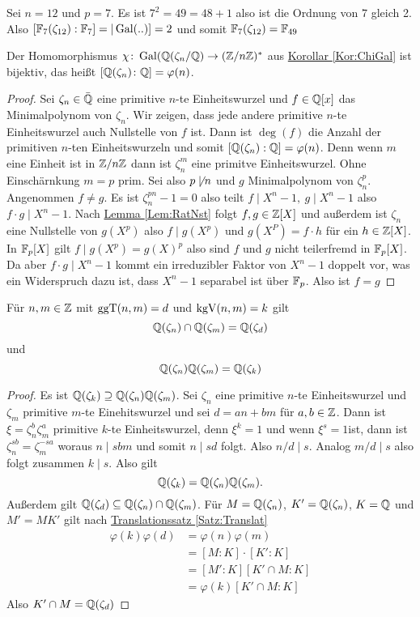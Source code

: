 \begin{Bsp}
  Sei $n=12$ und $p=7$. Es ist $7^2=49 =48+1$ also ist die Ordnung von $7$ gleich 2.
    Also $[\mathbb{F}_7(\zeta_{12}):\mathbb{F}_7]=|\operatorname{Gal}(..)]=2$ und somit $\mathbb{F}_7(\zeta_{12})=\mathbb{F}_{49}$
\end{Bsp}
\begin{Satz}
    Der Homomorphismus $\chi\colon\operatorname{Gal}(\mathbb{Q}(\zeta_n/\mathbb{Q})\to(\mathbb{Z}/n\mathbb{Z})^*$ aus \hyperref[Kor:ChiGal]{Korollar \ref{Kor:ChiGal}} ist bijektiv, das heißt $[\mathbb{Q}(\zeta_n)\colon \mathbb{Q}]=\varphi(n)$.
\end{Satz}
\begin{proof}
    Sei $\zeta_n\in\bar{\mathbb{Q}}$ eine primitive $n$-te Einheitswurzel und $f\in\mathbb{Q}[x]$ das Minimalpolynom von $\zeta_n$.
    Wir zeigen, dass jede andere primitive $n$-te Einheitswurzel auch Nullstelle von $f$ ist. Dann ist $
    \deg(f)$ die Anzahl der primitiven $n$-ten Einheitswurzeln und somit $[\mathbb{Q}(\zeta_n):\mathbb{Q}]=\varphi(n)$.
    Denn wenn $m$ eine Einheit ist in $\mathbb{Z}/n\mathbb{Z}$ dann ist $\zeta_n^m$ eine primitve Einheitswurzel.
    Ohne Einschärnkung $m=p$ prim.
    Sei also $p\not\mid n$ und $g$ Minimalpolynom von $\zeta_n^p$. Angenommen $f\neq g$.
    Es ist $\zeta_n^{pn}-1=0$ also teilt $f\mid X^n-1,\ g\mid X^n-1$ also $f\cdot g\mid X^n-1$. Nach \hyperref[Lem:RatNst]{Lemma \ref{Lem:RatNst}} folgt $f,g\in\mathbb{Z}[X]$ und außerdem ist $\zeta_n$ eine Nullstelle von $g(X^p)$ also $f\mid g(X^p)$ und $g(X^P)=f\cdot h$ für ein $h\in \mathbb{Z}[X]$.
    In $\mathbb{F}_p[X]$ gilt $f\mid g(X^p)=g(X)^p$ also sind $f$ und $g$ nicht teilerfremd in $\mathbb{F}_p[X]$. Da aber $f\cdot g\mid X^n-1$ kommt ein irreduzibler Faktor von $X^n-1$ doppelt vor, was ein Widerspruch dazu ist, dass $X^n-1$ separabel ist über $\mathbb{F}_p$.
    Also ist $f=g$
\end{proof}
\begin{Kor}
    Für $n,m\in\mathbb{Z}$ mit $\operatorname{ggT}(n,m)=d$ und $\operatorname{kgV}(n,m)=k$ gilt $$\mathbb{Q}(\zeta_n)\cap \mathbb{Q}(\zeta_m)=\mathbb{Q}(\zeta_d)$$ und $$\mathbb{Q}(\zeta_n)\mathbb{Q}(\zeta_m)=\mathbb{Q}(\zeta_k)$$
\end{Kor}
\begin{proof}
     Es ist $\mathbb{Q}(\zeta_k)\supseteq\mathbb{Q}(\zeta_n)\mathbb{Q}(\zeta_m)$.
     Sei $\zeta_n$ eine primitive $n$-te Einheitswurzel und $\zeta_m$ primitive $m$-te Einehitswurzel und sei $d=an+bm$ für $a,b\in\mathbb{Z}$.
     Dann ist $\xi=\zeta_n^b\zeta_m^a$ primitive $k$-te Einheitswurzel, denn $\xi^k=1$ und wenn $\xi^s=1$ist, dann ist $\zeta_n^{sb}=\zeta_m^{-sa}$ woraus $n\mid sbm$ und somit $n\mid sd$ folgt. Also $n/d\mid s$. Analog $m/d\mid s$ also folgt zusammen $k\mid s$. Also gilt $$\mathbb{Q}(\zeta_k)=\mathbb{Q}(\zeta_n)\mathbb{Q}(\zeta_m).$$ Außerdem gilt
     $\mathbb{Q}(\zeta_d)\subseteq \mathbb{Q}(\zeta_n)\cap\mathbb{Q}(\zeta_m)$.
     Für $M=\mathbb{Q}(\zeta_n)$, $K'=\mathbb{Q}(\zeta_n)$, $K=\mathbb{Q}$ und $M'=MK'$ gilt nach \hyperref[Satz:Translat]{Translationssatz \ref{Satz:Translat}} 
     \begin{align*}
         \varphi(k)\varphi(d)&=\varphi(n)\varphi(m)\\
         &=[M:K]\cdot [K':K]\\
         &=[M':K][K'\cap M:K]\\
         &=\varphi(k)[K'\cap M:K]
    \end{align*}
     Also $K'\cap M=\mathbb{Q}(\zeta_d)$
\end{proof}
